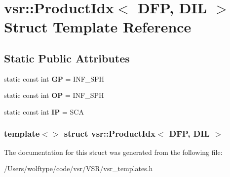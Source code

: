 \hypertarget{structvsr_1_1_product_idx_3_01_d_f_p_00_01_d_i_l_01_4}{\section{vsr\-:\-:Product\-Idx$<$ D\-F\-P, D\-I\-L $>$ Struct Template Reference}
\label{structvsr_1_1_product_idx_3_01_d_f_p_00_01_d_i_l_01_4}
}
\subsection*{Static Public Attributes}
\begin{DoxyCompactItemize}
\item 
\hypertarget{structvsr_1_1_product_idx_3_01_d_f_p_00_01_d_i_l_01_4_a765c39b22731ff4d21dc486333b2b417}{static const int {\bfseries G\-P} = I\-N\-F\-\_\-\-S\-P\-H}\label{structvsr_1_1_product_idx_3_01_d_f_p_00_01_d_i_l_01_4_a765c39b22731ff4d21dc486333b2b417}

\item 
\hypertarget{structvsr_1_1_product_idx_3_01_d_f_p_00_01_d_i_l_01_4_ad6d6b17bc9d72c25f5d0f239360fb915}{static const int {\bfseries O\-P} = I\-N\-F\-\_\-\-S\-P\-H}\label{structvsr_1_1_product_idx_3_01_d_f_p_00_01_d_i_l_01_4_ad6d6b17bc9d72c25f5d0f239360fb915}

\item 
\hypertarget{structvsr_1_1_product_idx_3_01_d_f_p_00_01_d_i_l_01_4_a5084d1911afb7549ec391eeeab6cfa6a}{static const int {\bfseries I\-P} = S\-C\-A}\label{structvsr_1_1_product_idx_3_01_d_f_p_00_01_d_i_l_01_4_a5084d1911afb7549ec391eeeab6cfa6a}

\end{DoxyCompactItemize}
\subsubsection*{template$<$$>$ struct vsr\-::\-Product\-Idx$<$ D\-F\-P, D\-I\-L $>$}



The documentation for this struct was generated from the following file\-:\begin{DoxyCompactItemize}
\item 
/\-Users/wolftype/code/vsr/\-V\-S\-R/vsr\-\_\-templates.\-h\end{DoxyCompactItemize}
